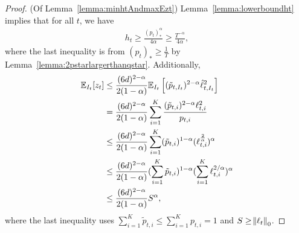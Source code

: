\begin{proof}(Of Lemma~\ref{lemma:minhtAndmaxEzt})
    Lemma~\ref{lemma:lowerboundht} implies that for all $t$, we have 
    \begin{align*}
        h_t \geq \frac{(p_t)_*^\alpha}{4\alpha} \geq \frac{T^{-\alpha}}{4\alpha},
    \end{align*}
    where the last inequality is from $(p_t)_* \geq \frac{1}{T}$ by Lemma~\ref{lemma:2pstarlargerthanqstar}. Additionally, 
    \begin{align*}
        \mathbb{E}_{I_t}[z_t] &\leq \frac{(6d)^{2-\alpha}}{2(1-\alpha)}\mathbb{E}_{I_t}\left[ (\tilde{p}_{t,I_t})^{2-\alpha} \hat{\ell}_{t,I_t}^2 \right] \\
        &= \frac{(6d)^{2-\alpha}}{2(1-\alpha)}\sum_{i=1}^K \frac{(\tilde{p}_{t,i})^{2-\alpha}\ell_{t,i}^2}{p_{t,i}} \\
        &\leq \frac{(6d)^{2-\alpha}}{2(1-\alpha)}\sum_{i=1}^K (\tilde{p}_{t,i})^{1-\alpha} (\ell_{t,i}^{\frac{2}{\alpha}})^{\alpha} \\
        &\leq \frac{(6d)^{2-\alpha}}{2(1-\alpha)} (\sum_{i=1}^K \tilde{p}_{t,i})^{1-\alpha}(\sum_{i=1}^K \ell_{t,i}^{2/\alpha})^{\alpha} \\
        &\leq \frac{(6d)^{2-\alpha}}{2(1-\alpha)} S^{\alpha},
    \end{align*}
    where the last inequality uses $\sum_{i=1}^K \tilde{p}_{t,i} \leq \sum_{i=1}^K p_{t,i} = 1$ and $S \geq \norm{\ell_t}_0$.
\end{proof}

